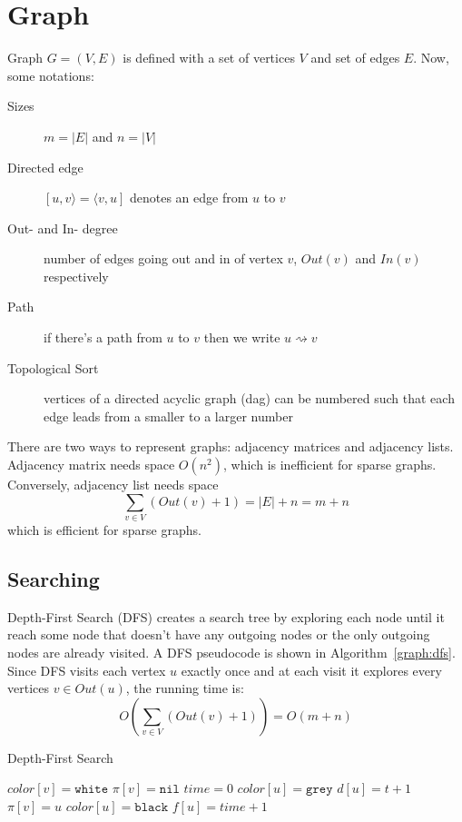 \section{Graph}
Graph $G=(V,E)$ is defined with a set of vertices $V$ and set of edges $E$.
Now, some notations:
\begin{description}
  \item[Sizes] $m=|E|$ and $n=|V|$
  \item[Directed edge] $[u,v\rangle=\langle v,u]$ denotes an edge from $u$ to
    $v$
  \item[Out- and In- degree] number of edges going out and in of vertex $v$,
    $Out(v)$ and $In(v)$ respectively
  \item[Path] if there's a path from $u$ to $v$ then we write
    $u\rightsquigarrow v$
  \item[Topological Sort] vertices of a directed acyclic graph (dag) can be
    numbered such that each edge leads from a smaller to a larger number
\end{description}

There are two ways to represent graphs: adjacency matrices and adjacency lists.
Adjacency matrix needs space $O(n^2)$, which is inefficient for sparse graphs.
Conversely, adjacency list needs space $$\sum_{v\in V} (Out(v) + 1)=|E|+n=m+n$$
which is efficient for sparse graphs.


\subsection{Searching}
Depth-First Search (DFS) creates a search tree by exploring each node until it
reach some node that doesn't have any outgoing nodes or the only outgoing nodes
are already visited.  A DFS pseudocode is shown in Algorithm~\ref{graph:dfs}.
Since DFS visits each vertex $u$ exactly once and at each visit it explores
every vertices $v\in Out(u)$, the running time is:
$$O(\sum_{v\in V}(Out(v)+1))=O(m+n)$$

\begin{algorithm}
  \caption{Depth-First Search}\label{graph:dfs}
  \begin{algorithmic}
      \State $color[v]=\texttt{white}$
      \State $\pi[v]=\texttt{nil}$
    \EndFor
    \State $time = 0$
        \State{}
      \EndIf
    \EndFor
    \EndFunction
    \State
      \State $color[u]=\texttt{grey}$
      \State $d[u]=t+1$
        \State{}
        \State $\pi[v]=u$
      \EndIf
      \State $color[u]=\texttt{black}$
      \State $f[u]=time+1$
      \EndFor
    \EndFunction
  \end{algorithmic}
\end{algorithm}

